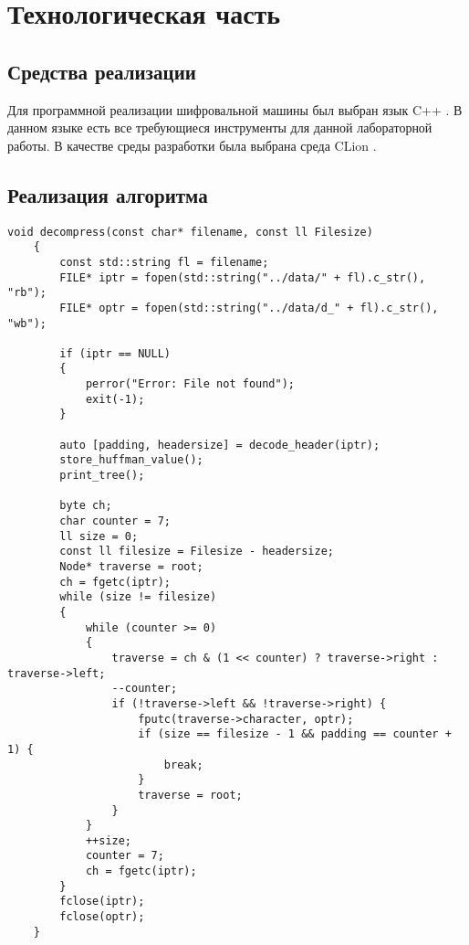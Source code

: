 \chapter{Технологическая часть}

\section{Средства реализации}

Для программной реализации шифровальной машины был выбран язык C++ \cite{cpp}.
В данном языке есть все требующиеся инструменты для данной лабораторной работы.
В качестве среды разработки была выбрана среда CLion \cite{clion}.

\section{Реализация алгоритма}

\begin{lstlisting}[caption=Алгоритм сжатия файла]
	void decompress(const char* filename, const ll Filesize)
	{
		const std::string fl = filename;
		FILE* iptr = fopen(std::string("../data/" + fl).c_str(), "rb");
		FILE* optr = fopen(std::string("../data/d_" + fl).c_str(), "wb");
		
		if (iptr == NULL)
		{
			perror("Error: File not found");
			exit(-1);
		}
		
		auto [padding, headersize] = decode_header(iptr);
		store_huffman_value();
		print_tree();
		
		byte ch;
		char counter = 7;
		ll size = 0;
		const ll filesize = Filesize - headersize;
		Node* traverse = root;
		ch = fgetc(iptr);
		while (size != filesize)
		{
			while (counter >= 0)
			{
				traverse = ch & (1 << counter) ? traverse->right : traverse->left;
				--counter;
				if (!traverse->left && !traverse->right) {
					fputc(traverse->character, optr);
					if (size == filesize - 1 && padding == counter + 1) {
						break;
					}
					traverse = root;
				}
			}
			++size;
			counter = 7;
			ch = fgetc(iptr);
		}
		fclose(iptr);
		fclose(optr);
	}
\end{lstlisting}

